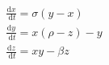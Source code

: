 \documentclass[preview]{standalone}
\begin{document}
\begin{align*}
\frac{\mathrm{d}  x }{\mathrm{~d} t} = \sigma( y  -  x ) \\
            \frac{\mathrm{d}  y }{\mathrm{~d} t} =  x (\rho -  z ) -  y  \\
            \frac{\mathrm{d}  z }{\mathrm{~d} t} =  x   y  - \beta  z
\end{align*}
\end{document}
